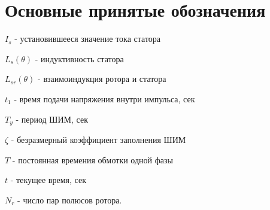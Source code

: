\section{ Основные принятые обозначения }

$I_{s}$ - установившееся значение тока статора

$L_{s}(\theta)$ - индуктивность статора

$L_{sr}(\theta)$ - взаимоиндукция ротора и статора

$t_{1}$ - время подачи напряжения внутри импульса, сек

$T_{y}$ - период ШИМ, сек

$\zeta$ - безразмерный коэффициент заполнения ШИМ

$T$ - постоянная времения обмотки одной фазы

$t$ - текущее время, сек

$N_{r}$ - число пар полюсов ротора.

